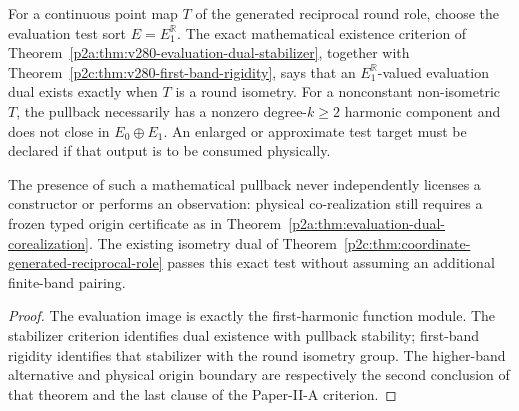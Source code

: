 \documentclass[12pt,a4paper]{article}
\begin{document}
\begin{corollary}
\label{p2c:cor:v280-first-band-dual-firewall}
For a continuous point map $T$ of the generated reciprocal round role,
choose the evaluation test sort $E=E_1^{\mathbb R}$.  The exact
mathematical existence criterion of
Theorem~\ref{p2a:thm:v280-evaluation-dual-stabilizer}, together with
Theorem~\ref{p2c:thm:v280-first-band-rigidity}, says that an
$E_1^{\mathbb R}$-valued evaluation dual exists exactly when $T$ is a
round isometry.  For a nonconstant non-isometric $T$, the pullback
necessarily has a nonzero degree-$k\ge2$ harmonic component and does
not close in $E_0\oplus E_1$.  An enlarged or approximate test target
must be declared if that output is to be consumed physically.

The presence of such a mathematical pullback never independently
licenses a constructor or performs an observation: physical co-realization
still requires a frozen typed origin certificate as in
Theorem~\ref{p2a:thm:evaluation-dual-corealization}.  The existing
isometry dual of Theorem~\ref{p2c:thm:coordinate-generated-reciprocal-role}
passes this exact test without assuming an additional finite-band pairing.
\end{corollary}
\begin{proof}
The evaluation image is exactly the first-harmonic function module.
The stabilizer criterion identifies dual existence with pullback stability;
first-band rigidity identifies that stabilizer with the round isometry
group.  The higher-band alternative and physical origin boundary are
respectively the second conclusion of that theorem and the last clause
of the Paper-II-A criterion.
\end{proof}
\end{document}
